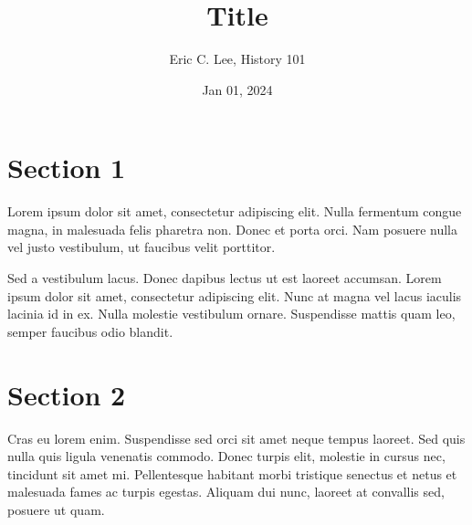 \documentclass[a4paper, 12pt]{article}
\title{Title}
\author{Eric C. Lee, History 101} \date{Jan 01, 2024}
\begin{document}
    \maketitle

    \section*{Section 1}

    Lorem ipsum\autocite[pg 114-153]{Kramer_1967} dolor sit amet, consectetur adipiscing elit. Nulla fermentum congue magna, in malesuada felis pharetra non. Donec et porta orci. Nam posuere nulla vel justo vestibulum, ut faucibus velit porttitor.

    Sed a vestibulum lacus. Donec dapibus lectus ut est laoreet accumsan. Lorem ipsum dolor sit amet, consectetur adipiscing elit. Nunc at magna vel lacus iaculis lacinia id in ex. Nulla molestie vestibulum ornare. Suspendisse mattis quam leo, semper faucibus odio blandit.

    \section*{Section 2}

    Cras eu lorem enim. Suspendisse sed orci sit amet neque tempus laoreet. Sed quis nulla quis ligula venenatis commodo. Donec turpis elit, molestie in cursus nec, tincidunt sit amet mi. Pellentesque habitant morbi tristique senectus et netus et malesuada fames ac turpis egestas. Aliquam dui nunc, laoreet at convallis sed, posuere ut quam.

    \newpage

    \printbibliography
\end{document}
